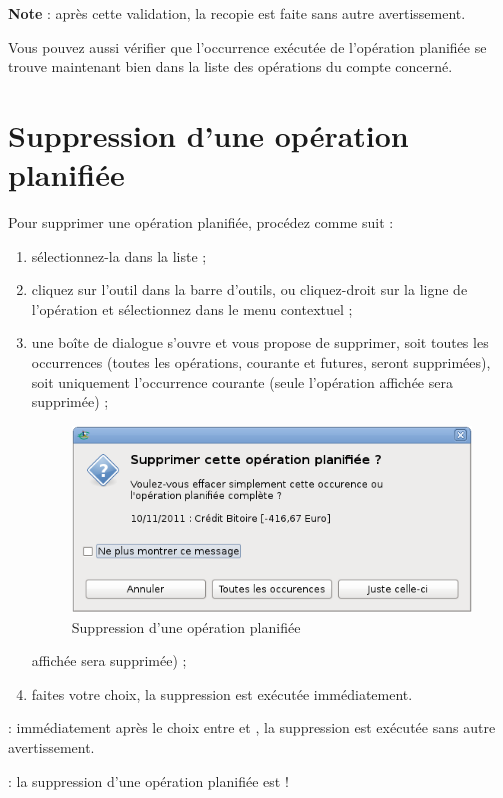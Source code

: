 \textbf{Note} : après cette validation, la recopie est faite sans autre avertissement.

Vous pouvez aussi vérifier que l'occurrence exécutée de l'opération planifiée se trouve maintenant bien dans  la liste des opérations du compte concerné.


\section{Suppression d'une opération planifiée\label{plannedtransactions-remove}}


Pour supprimer une opération planifiée, procédez comme suit :

\begin{enumerate}
	 \item sélectionnez-la dans la liste ;
	 \item cliquez sur l'outil  dans la barre d'outils, ou cliquez-droit sur la ligne de l'opération et sélectionnez  dans le menu contextuel ;
	 \item une  boîte de dialogue s'ouvre et vous propose de supprimer, soit toutes les occurrences (toutes les opérations, courante et futures, seront supprimées), soit uniquement l'occurrence courante (seule l'opération \ifIllustration affichée sera supprimée) ;
	\begin{figure}[htbp]
	\begin{center}
	\includegraphics[scale=0.5]{image/screenshot/planned_transactions_delete}
	\end{center}
	\caption{Suppression d'une opération planifiée}
	\label{planned-transactions-delete-img}
	\end{figure}
	\else affichée sera supprimée) ;
	\fi
	 \item faites votre choix, la suppression est exécutée immédiatement.
\end{enumerate}

 : immédiatement après le choix entre  et , la suppression est exécutée sans autre avertissement. 

 : la suppression d'une opération planifiée est  ! 

